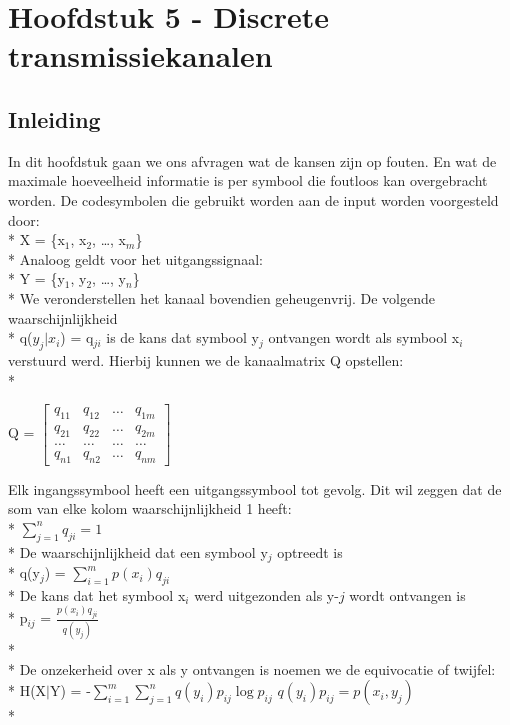 \documentclass[10pt]{article}
\begin{document}
\section{Hoofdstuk 5 - Discrete transmissiekanalen}
\subsection{Inleiding}
In dit hoofdstuk gaan we ons afvragen wat de kansen zijn op fouten. En wat de maximale hoeveelheid informatie is per symbool die foutloos kan overgebracht worden. De codesymbolen die gebruikt worden aan de input worden voorgesteld door:\\*
X = \{x$_1$, x$_2$, \dots, x$_m$\}\\*
Analoog geldt voor het uitgangssignaal:\\*
Y = \{y$_1$, y$_2$, \dots, y$_n$\}\\*
We veronderstellen het kanaal bovendien geheugenvrij. De volgende waarschijnlijkheid\\*
q($y_j|x_i$) = q$_{ji}$ is de kans dat symbool y$_j$ ontvangen wordt als symbool x$_i$ verstuurd werd. Hierbij kunnen we de kanaalmatrix Q opstellen:\\*
\begin{center}
Q = $\left[\begin{matrix} 
q_{11} & q_{12} & \dots & q_{1m} \\
q_{21} & q_{22} & \dots & q_{2m} \\
\dots & \dots & \dots & \dots \\
q_{n1} & q_{n2} & \dots & q_{nm}
\end{matrix}\right]$
\end{center}
Elk ingangssymbool heeft een uitgangssymbool tot gevolg. Dit wil zeggen dat de som van elke kolom waarschijnlijkheid 1 heeft:\\*
$\sum_{j=1}^n q_{ji} = 1$\\*
De waarschijnlijkheid dat een symbool y$_j$ optreedt is\\*
q(y$_j$) = $\sum_{i=1}^m p(x_i)q_{ji}$\\*
De kans dat het symbool x$_i$ werd uitgezonden als y-$j$ wordt ontvangen is\\*
p$_{ij}$ = $\frac{p(x_i)q_{ji}}{q(y_j)}$\\*\\*
De onzekerheid over x als y ontvangen is noemen we de equivocatie of twijfel:\\*
H(X$|$Y) = -$\sum_{i=1}^m\sum_{j=1}^n q(y_i)p_{ij}\log{p_{ij}}$ {\scriptsize $q(y_i)p_{ij} = p(x_i,y_j)$}\\*
\end{document}
